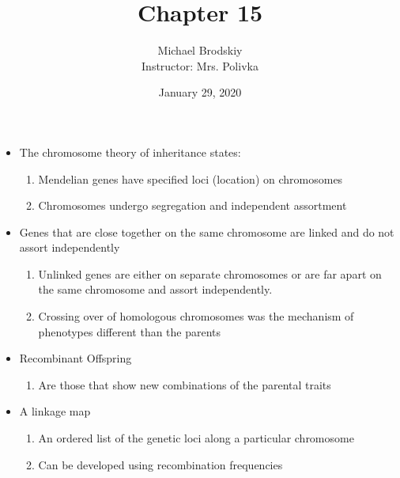 \documentclass[12pt]{article}
\title{Chapter 15}
\date{January 29, 2020}
\author{Michael Brodskiy\\ \small Instructor: Mrs. Polivka}
\begin{document}
\maketitle

\begin{itemize}

  \item The chromosome theory of inheritance states:

    \begin{enumerate}

      \item Mendelian genes have specified loci (location) on chromosomes

      \item Chromosomes undergo segregation and independent assortment

    \end{enumerate}

  \item Genes that are close together on the same chromosome are linked and do not assort independently

    \begin{enumerate}

      \item Unlinked genes are either on separate chromosomes or are far apart on the same chromosome and assort independently.

      \item Crossing over of homologous chromosomes was the mechanism of phenotypes different than the parents

    \end{enumerate}

  \item Recombinant Offspring

    \begin{enumerate}

      \item Are those that show new combinations of the parental traits

    \end{enumerate}

  \item A linkage map

    \begin{enumerate}

      \item An ordered list of the genetic loci along a particular chromosome

      \item Can be developed using recombination frequencies


\end{enumerate}
\end{itemize}
\end{document}
